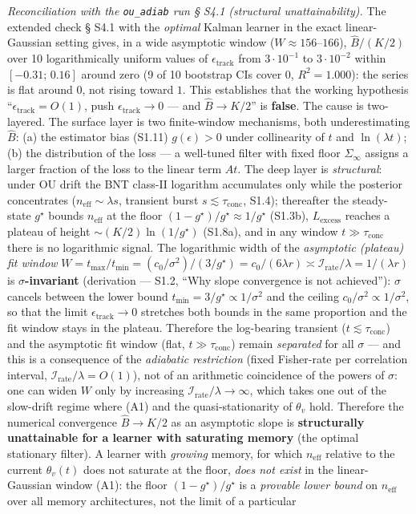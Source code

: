 \documentclass[12pt]{iopart}
\begin{document}
\emph{Reconciliation with the \texttt{ou\_adiab} run § S4.1 (structural unattainability).} The extended check § S4.1 with the \emph{optimal} Kalman learner in the exact linear-Gaussian setting gives, in a wide asymptotic window (\(W \approx 156\)--\(166\)), \(\hat B/(K/2)\) over 10 logarithmically uniform values of \(\epsilon_{\text{track}}\) from \(3\cdot10^{-1}\) to \(3\cdot10^{-2}\) within \([-0.31;\,0.16]\) around zero (9 of 10 bootstrap CIs cover \(0\), \(R^2 = 1.000\)): the series is flat around \(0\), not rising toward \(1\). This establishes that the working hypothesis ``\(\epsilon_{\text{track}} = O(1)\), push \(\epsilon_{\text{track}} \to 0\) --- and \(\hat B \to K/2\)'' is \textbf{false}. The cause is two-layered. The surface layer is two finite-window mechanisms, both underestimating \(\hat B\): (a) the estimator bias (S1.11) \(g(\epsilon) > 0\) under collinearity of \(t\) and \(\ln(\lambda t)\); (b) the distribution of the loss --- a well-tuned filter with fixed floor \(\Sigma_\infty\) assigns a larger fraction of the loss to the linear term \(A t\). The deep layer is \emph{structural}: under OU drift the BNT class-II logarithm \cite{BialekNemenmanTishby2001} accumulates only while the posterior concentrates (\(n_{\text{eff}} \sim \lambda s\), transient burst \(s \lesssim \tau_{\text{conc}}\), S1.4); thereafter the steady-state \(g^\star\) bounds \(n_{\text{eff}}\) at the floor \((1-g^\star)/g^\star \approx 1/g^\star\) (S1.3b), \(L_{\text{excess}}\) reaches a plateau of height \(\sim (K/2)\ln(1/g^\star)\) (S1.8a), and in any window \(t \gg \tau_{\text{conc}}\) there is no logarithmic signal. The logarithmic width of the \emph{asymptotic (plateau) fit window} \(W = t_{\max}/t_{\min} = (c_0/\sigma^2)/(3/g^\star) = c_0/(6\lambda r) \asymp \mathcal I_{\text{rate}}/\lambda = 1/(\lambda r)\) is \textbf{\(\sigma\)-invariant} (derivation --- S1.2, ``Why slope convergence is not achieved''): \(\sigma\) cancels between the lower bound \(t_{\min} = 3/g^\star \propto 1/\sigma^2\) and the ceiling \(c_0/\sigma^2 \propto 1/\sigma^2\), so that the limit \(\epsilon_{\text{track}} \to 0\) stretches both bounds in the same proportion and the fit window stays in the plateau. Therefore the log-bearing transient (\(t \lesssim \tau_{\text{conc}}\)) and the asymptotic fit window (flat, \(t \gg \tau_{\text{conc}}\)) remain \emph{separated} for all \(\sigma\) --- and this is a consequence of the \emph{adiabatic restriction} (fixed Fisher-rate per correlation interval, \(\mathcal I_{\text{rate}}/\lambda = O(1)\)), not of an arithmetic coincidence of the powers of \(\sigma\): one can widen \(W\) only by increasing \(\mathcal I_{\text{rate}}/\lambda \to \infty\), which takes one out of the slow-drift regime where (A1) and the quasi-stationarity of \(\theta_v\) hold. Therefore the numerical convergence \(\hat B \to K/2\) as an asymptotic slope is \textbf{structurally unattainable for a learner with saturating memory} (the optimal stationary filter). A learner with \emph{growing} memory, for which \(n_{\text{eff}}\) relative to the current \(\theta_v(t)\) does not saturate at the floor, \emph{does not exist} in the linear-Gaussian window (A1): the floor \((1-g^\star)/g^\star\) is a \emph{provable lower bound} on \(n_{\text{eff}}\) over all memory architectures, not the limit of a particular 
\end{document}
